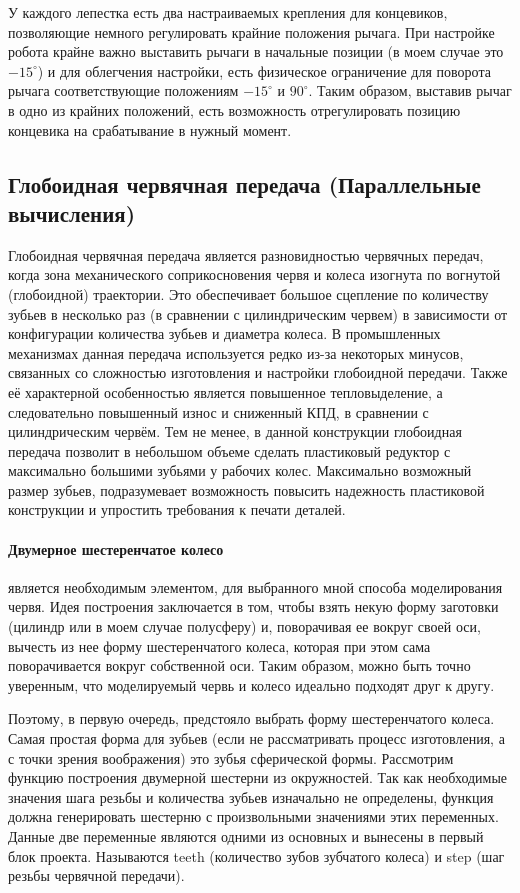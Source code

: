 У каждого лепестка есть два настраиваемых крепления для концевиков, позволяющие немного регулировать крайние положения рычага. При настройке робота крайне важно выставить рычаги в начальные позиции (в моем случае это $-15^{\circ}$) и для облегчения настройки, есть физическое ограничение для поворота рычага соответствующие положениям $-15^{\circ}$ и $90^{\circ}$. Таким образом, выставив рычаг в одно из крайних положений, есть возможность отрегулировать позицию концевика на срабатывание в нужный момент. 

\subsection{Глобоидная червячная передача (Параллельные вычисления)}

Глобоидная червячная передача является разновидностью червячных передач, когда зона механического соприкосновения червя и колеса изогнута по вогнутой (глобоидной) траектории. Это обеспечивает большое сцепление по количеству зубьев в несколько раз (в сравнении с цилиндрическим червем) в зависимости от конфигурации количества зубьев и диаметра колеса. В промышленных механизмах данная передача используется редко из-за некоторых минусов, связанных со сложностью изготовления и настройки глобоидной передачи. Также её характерной особенностью является повышенное тепловыделение, а следовательно повышенный износ и сниженный КПД, в сравнении с цилиндрическим червём. Тем не менее, в данной конструкции глобоидная передача позволит в небольшом объеме сделать пластиковый редуктор с максимально большими зубьями у рабочих колес. Максимально возможный размер зубьев, подразумевает возможность повысить надежность пластиковой конструкции и упростить требования к печати деталей.  

\paragraph{Двумерное шестеренчатое колесо} является необходимым элементом, для выбранного мной способа моделирования червя. Идея построения заключается в том, чтобы взять некую форму заготовки (цилиндр или в моем случае полусферу) и, поворачивая ее вокруг своей оси, вычесть из нее форму шестеренчатого колеса, которая при этом сама поворачивается вокруг собственной оси. Таким образом, можно быть точно уверенным, что моделируемый червь и колесо идеально подходят друг к другу.

Поэтому, в первую очередь, предстояло выбрать форму шестеренчатого колеса. Самая простая форма для зубьев (если не рассматривать процесс изготовления, а с точки зрения воображения) это зубья сферической формы. Рассмотрим функцию построения двумерной шестерни из окружностей. Так как необходимые значения шага резьбы и количества зубьев изначально не определены, функция должна генерировать шестерню с произвольными значениями этих переменных. Данные две переменные являются одними из основных и вынесены в первый блок проекта. Называются teeth (количество зубов зубчатого колеса) и step (шаг резьбы червячной передачи). 
\vspace{0.5cm}

